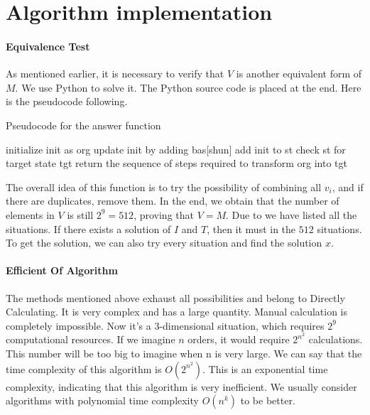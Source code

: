 \documentclass[
  manuscript=article,  %
  layout=preprint,  %
  year=20xx,
  volume=x,
]{extra/joas}
\begin{document}
\section{Algorithm implementation}

\paragraph{Equivalence Test} As mentioned earlier, it is necessary to verify that $V$ is another equivalent form of $M$. 
We use Python to solve it. The Python source code is placed at the end. Here is the pseudocode following. 

\begin{algorithm}
  \caption{Pseudocode for the answer function}
  \begin{algorithmic}[1]
      \State initialize init as org
          \State update init by adding bas[shun]
      \EndFor
          \State add init to st
      \EndIf
  \EndFor
  \State check st for target state tgt
      \State return the sequence of steps required to transform org into tgt
  \EndIf
  \end{algorithmic}
  \end{algorithm}

The overall idea of this function is to try the possibility of combining all $v_i$, 
and if there are duplicates, remove them. 
In the end, we obtain that the number of elements in $V$ is still $2^9 = 512$, proving that $V=M$. 
Due to we have listed all the situations. If there exists a solution of $I$ and $T$, then it must in the $512$ situations. 
To get the solution, we can also try every situation and find the solution $x$. 

\paragraph{Efficient Of Algorithm} The methods mentioned above exhaust all possibilities and belong to Directly Calculating. 
It is very complex and has a large quantity. Manual calculation is completely impossible. 
Now it's a 3-dimensional situation, which requires $2 ^ 9$ computational resources. 
If we imagine $n$ orders, it would require $2^{n^2}$ calculations. 
This number will be too big to imagine when n is very large. 
We can say that the time complexity of this algorithm is $O(2^{n^2})$. 
This is an exponential time complexity, indicating that this algorithm is very inefficient. 
We usually consider algorithms with polynomial time complexity $O(n^k)$ to be better. 
\end{document}
